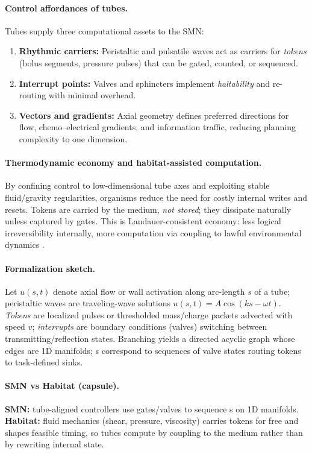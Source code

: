 \paragraph{Control affordances of tubes.}
Tubes supply three computational assets to the SMN:
\begin{enumerate}
  \item \textbf{Rhythmic carriers:} Peristaltic and pulsatile waves act as carriers for \emph{tokens} (bolus segments, pressure pulses) that can be gated, counted, or sequenced.
  \item \textbf{Interrupt points:} Valves and sphincters implement \emph{haltability} and re-routing with minimal overhead.
  \item \textbf{Vectors and gradients:} Axial geometry defines preferred directions for flow, chemo--electrical gradients, and information traffic, reducing planning complexity to one dimension.
\end{enumerate}

\paragraph{Thermodynamic economy and habitat-assisted computation.}
By confining control to low-dimensional tube axes and exploiting stable fluid/gravity regularities, organisms reduce the need for costly internal writes and resets.
Tokens are carried by the medium, \emph{not stored}; they dissipate naturally unless captured by gates.
This is Landauer-consistent economy: less logical irreversibility internally, more computation via coupling to lawful environmental dynamics \cite{Landauer1961Irreversibility,Bennett2003LandauerNotes,StillEtAl2012ThermoPrediction}.

\paragraph{Formalization sketch.}
Let $u(s,t)$ denote axial flow or wall activation along arc-length $s$ of a tube; peristaltic waves are traveling-wave solutions $u(s,t)=A\cos(ks-\omega t)$.
\emph{Tokens} are localized pulses or thresholded mass/charge packets advected with speed $v$; \emph{interrupts} are boundary conditions (valves) switching between transmitting/reflection states.
Branching yields a directed acyclic graph whose edges are 1D manifolds; \OAP{}s correspond to sequences of valve states routing tokens to task-defined sinks.

\paragraph{SMN vs Habitat (capsule).}
\textbf{SMN:} tube-aligned controllers use gates/valves to sequence \OAP{}s on 1D manifolds.
\textbf{Habitat:} fluid mechanics (shear, pressure, viscosity) carries tokens for free and shapes feasible timing, so tubes compute by coupling to the medium rather than by rewriting internal state.
